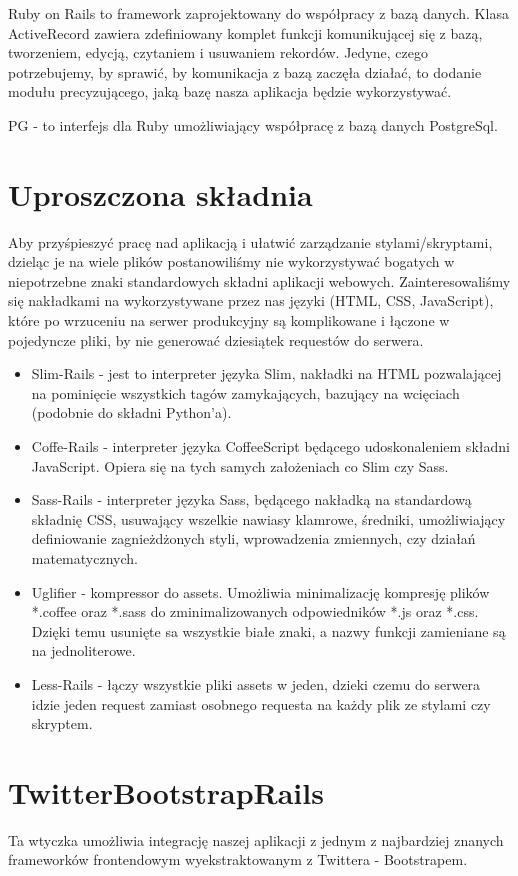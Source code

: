 Ruby on Rails to framework zaprojektowany do współpracy z bazą danych. Klasa ActiveRecord zawiera zdefiniowany komplet funkcji komunikującej się z bazą, tworzeniem, edycją, czytaniem i usuwaniem rekordów. Jedyne, czego potrzebujemy, by sprawić, by komunikacja z bazą zaczęła działać, to dodanie modułu precyzującego, jaką bazę nasza aplikacja będzie wykorzystywać.

PG - to interfejs dla Ruby umożliwiający współpracę z bazą danych PostgreSql.

\section{Uproszczona składnia}
Aby przyśpieszyć pracę nad aplikacją i ułatwić zarządzanie stylami/skryptami, dzieląc je na wiele plików postanowiliśmy nie wykorzystywać bogatych w niepotrzebne znaki standardowych składni aplikacji webowych. Zainteresowaliśmy się nakładkami na wykorzystywane przez nas języki (HTML, CSS, JavaScript), które po wrzuceniu na serwer produkcyjny są komplikowane i łączone w pojedyncze pliki, by nie generować dziesiątek requestów do serwera.

\begin{itemize}
	\item Slim-Rails - jest to interpreter języka Slim, nakładki na HTML pozwalającej na pominięcie wszystkich tagów zamykających, bazujący na wcięciach (podobnie do składni Python'a).
\item Coffe-Rails - interpreter języka CoffeeScript będącego udoskonaleniem składni JavaScript. Opiera się na tych samych założeniach co Slim czy Sass.
\item Sass-Rails - interpreter języka Sass, będącego nakładką na standardową składnię CSS, usuwający wszelkie nawiasy klamrowe, średniki, umożliwiający definiowanie zagnieżdżonych styli, wprowadzenia zmiennych, czy działań matematycznych.
\item Uglifier - kompressor do assets. Umożliwia minimalizację kompresję plików *.coffee oraz *.sass do zminimalizowanych odpowiedników *.js oraz *.css. Dzięki temu usunięte sa wszystkie białe znaki, a nazwy funkcji zamieniane są na jednoliterowe.
\item Less-Rails - łączy wszystkie pliki assets w jeden, dzieki czemu do serwera idzie jeden request zamiast osobnego requesta na każdy plik ze stylami czy skryptem.
\end{itemize}

\section{TwitterBootstrapRails}
Ta wtyczka umożliwia integrację naszej aplikacji z jednym z najbardziej znanych frameworków frontendowym wyekstraktowanym z Twittera - Bootstrapem.

